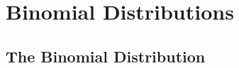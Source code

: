 \documentclass[../alevelmaths.tex]{subfiles}
\begin{document}
\chapter{Binomial Distributions}
\section{The Binomial Distribution}
\end{document}
